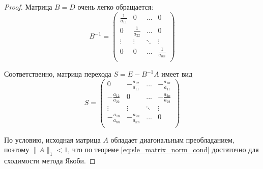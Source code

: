 \documentclass{article}
\begin{document}
\begin{proof}
	Матрица $B=D$ очень легко обращается:
	\[B^{-1}=
		\begin{pmatrix}
			\frac{1}{a_{11}}	& 0	& ...	& 0 \\
			0	& \frac{1}{a_{22}}& ...	& 0 \\
			\vdots	& \vdots&\ddots &\vdots \\
			0	& 0	& ...	& \frac{1}{a_{nn}} \\
		\end{pmatrix}
	\]

	Соответственно, матрица перехода $S=E-B^{-1}A$ имеет вид
	\[S=
		\begin{pmatrix}
			0	&-\frac{a_{12}}{a_{11}} &... &
				-\frac{a_{1n}}{a_{11}} \\
			-\frac{a_{12}}{a_{22}}& 0	&... &
				-\frac{a_{2n}}{a_{22}} \\
			\vdots	& \vdots&\ddots &\vdots \\
			-\frac{a_{1n}}{a_{nn}}	& -\frac{a_{2n}}{a_{nn}} &
				...	& 0 \\
		\end{pmatrix}
	\]

	По условию, исходная матрица $A$ обладает диагональным преобладанием,
	поэтому $\|A\|_1<1$, что по теореме \eqref{eq:sle_matrix_norm_cond}
	достаточно для сходимости метода Якоби.
\end{proof}
\end{document}
